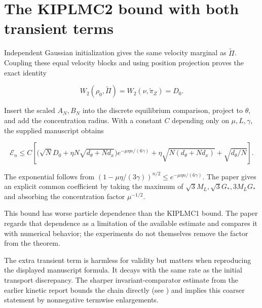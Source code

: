 \documentclass[11pt,a4paper]{article}
\begin{document}
\section{\texorpdfstring{The KIPLMC2 bound with both transient terms}{The KIPLMC2 bound with both transient terms}}


Independent Gaussian initialization gives the same velocity marginal as
\(\widetilde\Pi\). Coupling these equal velocity blocks and using position
projection proves the exact identity


\[W_2(\rho_0,\widetilde\Pi)
=W_2(\nu,\widetilde\pi_Z)=D_0.\]


Insert the scaled \(A_N,B_N\) into the discrete equilibrium comparison,
project to \(\theta\), and add the concentration radius. With a constant
\(C\) depending only on \(\mu,L,\gamma\), the supplied manuscript obtains


\[\mathcal E_n\le C\left[
\bigl(\sqrt N D_0+\eta N\sqrt{d_\theta+Nd_x}\bigr)
e^{-\mu\eta n/(6\gamma)}
+\eta\sqrt{N(d_\theta+Nd_x)}
+\sqrt{d_\theta/N}\right].\]


The exponential follows from
\((1-\mu\eta/(3\gamma))^{n/2}\le e^{-\mu\eta n/(6\gamma)}\).
The paper gives an explicit common coefficient by taking the maximum of
\(\sqrt3M_L,\sqrt3G_*,3M_LG_*\) and absorbing the concentration factor
\(\mu^{-1/2}\).




This bound has worse particle dependence than the KIPLMC1 bound. The paper
regards that dependence as a limitation of the available estimate and compares
it with numerical behavior; the experiments do not themselves remove the
factor from the theorem.



The extra transient term is harmless for validity but matters when reproducing the displayed manuscript formula. It decays with the same rate as the initial transport discrepancy. The sharper invariant-comparator estimate from the earlier kinetic report bounds the chain directly (see \cite[Section~3.123.4]{LangevinLean2026Kinetic}) and implies this coarser statement by nonnegative termwise enlargements.
\end{document}
